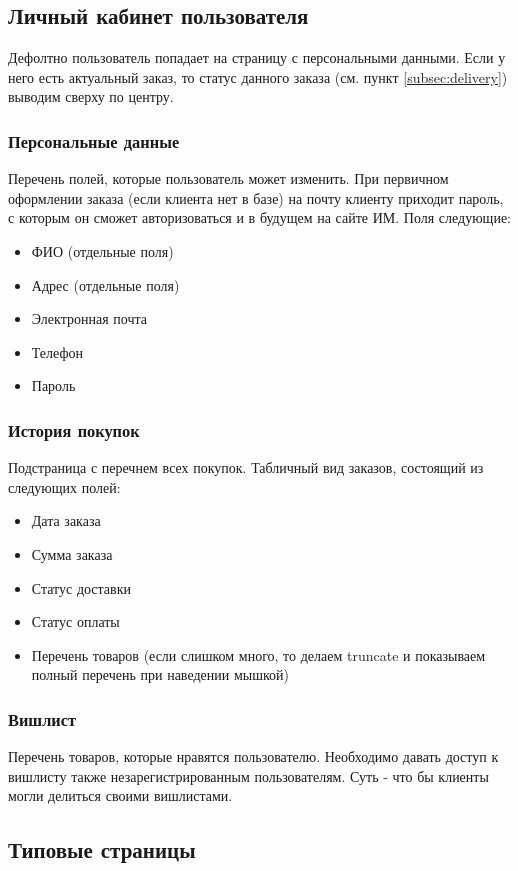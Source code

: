 \documentclass[DIV=calc, paper=a4, fontsize=11pt]{scrartcl} %
\begin{document}
\subsection{Личный кабинет пользователя}
Дефолтно пользователь попадает на страницу с персональными данными. Если у него есть актуальный заказ, то статус данного заказа (см. пункт \ref{subsec:delivery}) выводим сверху по центру.

\subsubsection{Персональные данные}
Перечень полей, которые пользователь может изменить. При первичном оформлении заказа (если клиента нет в базе) на почту клиенту приходит пароль, с которым он сможет авторизоваться и в будущем на сайте ИМ. Поля следующие:
\begin{itemize}
	\item ФИО (отдельные поля)
	\item Адрес (отдельные поля)
	\item Электронная почта
	\item Телефон
	\item Пароль
\end{itemize}

\subsubsection{История покупок}
Подстраница с перечнем всех покупок. Табличный вид заказов, состоящий из следующих полей:
\begin{itemize}
	\item Дата заказа
	\item Сумма заказа
	\item Статус доставки
	\item Статус оплаты
	\item Перечень товаров (если слишком много, то делаем truncate и показываем полный перечень при наведении мышкой)
\end{itemize}

\subsubsection{Вишлист}
Перечень товаров, которые нравятся пользователю. Необходимо давать доступ к вишлисту также незарегистрированным пользователям. Суть - что бы клиенты могли делиться своими вишлистами. 

\subsection{Типовые страницы}
\end{document}
